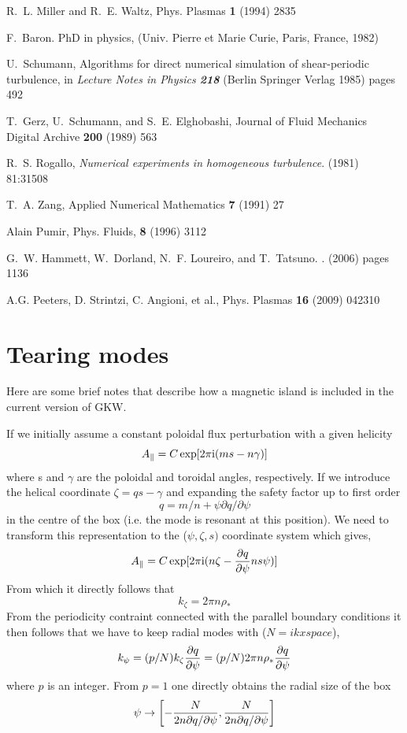 \documentclass{report}
\def\be{\begin{equation}}
\def\ee{\end{equation}}
\begin{document}
\begin{thebibliography}{10}
R.~L. Miller and R.~E. Waltz, Phys. Plasmas {\bf 1} (1994) 2835

F.~Baron. {PhD} in physics, (Univ. Pierre et Marie Curie, Paris, France, 1982) 

U.~{Schumann}, {Algorithms for direct numerical simulation of shear-periodic
  turbulence}, in {\em Lecture Notes in
  Physics {\bf 218}} (Berlin Springer Verlag 1985) pages 492

T.~Gerz, U.~Schumann, and S.~E. Elghobashi, Journal of Fluid Mechanics Digital Archive {\bf 200} 
(1989) 563

R.~S. {Rogallo}, {\em Numerical experiments in homogeneous turbulence}.
 (1981) 81:31508

T.~A. {Zang}, Applied Numerical Mathematics {\bf 7} (1991) 27

 Alain Pumir, Phys. Fluids, {\bf 8} (1996) 3112

G.~W. {Hammett}, W.~{Dorland}, N.~F. {Loureiro}, and T.~{Tatsuno}.
.
 (2006) pages 1136 

 A.G. Peeters, D. Strintzi, C. Angioni, et al., Phys. Plasmas {\bf 16} (2009) 042310


\end{thebibliography}



\chapter{Tearing modes}

Here are some brief notes that describe how a magnetic island is included in the current version of GKW.

If we initially assume a constant poloidal flux perturbation with a given helicity 
\be 
A_\parallel = C \exp [ 2 \pi {\rm i} (m s - n \gamma ) ] 
\ee 
where s and $\gamma$ are the poloidal and toroidal angles, respectively.  If we introduce the helical coordinate $\zeta = qs - \gamma$ and expanding the safety factor up to first order
\be 
q = m / n + \psi\partial q /\partial\psi
\ee 
in the centre of the box (i.e. the mode is resonant at this position). We need to transform this
representation to the ($\psi, \zeta, s)$ coordinate system which gives,
\be 
A_\parallel = C \exp [ 2 \pi {\rm i} ( n \zeta - {\partial q \over \partial \psi} n s \psi ) ] 
\ee 
From which it directly follows that 
\be 
k_\zeta = 2 \pi n \rho_* 
\ee
From the periodicity contraint connected with the parallel boundary conditions it then follows 
that we have to keep radial modes with ($N = ikxspace$),
\be 
k_\psi = (p/N) k_\zeta {\partial q \over \partial \psi} = (p/N) 2 \pi n \rho_* {\partial q \over \partial \psi} 
\ee 
where $p$ is an integer. From $p = 1$ one directly obtains the radial size of the box 
\be 
\psi \rightarrow \biggl [ - { N \over 2 n \partial q / \partial \psi} , {N \over 2 n \partial q / \partial \psi} \biggr ]  
\ee
\end{document}
